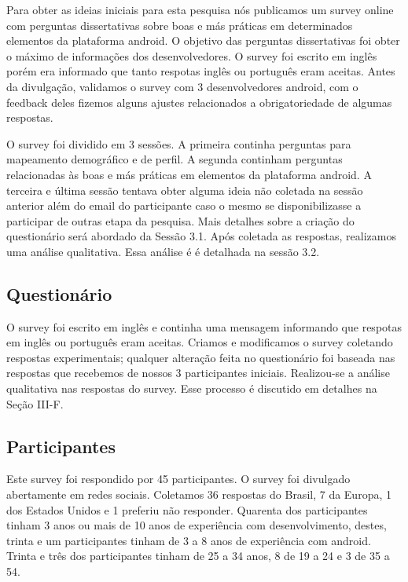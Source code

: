 Para obter as ideias iniciais para esta pesquisa n\'os publicamos um survey online com perguntas dissertativas sobre boas e m\'as pr\'aticas em determinados elementos da plataforma android. O objetivo das perguntas dissertativas foi obter o m\'aximo de informa\c{c}\~oes dos desenvolvedores. O survey foi escrito em ingl\^es porém era informado que tanto respotas ingl\^es ou portugu\^es eram aceitas. Antes da divulga\c{c}\~ao, validamos o survey com 3 desenvolvedores android, com o feedback deles fizemos alguns ajustes relacionados a obrigatoriedade de algumas respostas. 

O survey foi dividido em 3 sess\~oes. A primeira continha perguntas para mapeamento demogr\'afico e de perfil. A segunda continham perguntas relacionadas às boas e m\'as pr\'aticas em elementos da plataforma android. A terceira e última sess\~ao tentava obter alguma ideia n\~ao coletada na sess\~ao anterior além do email do participante caso o mesmo se disponibilizasse a participar de outras etapa da pesquisa. Mais detalhes sobre a cria\c{c}\~ao do question\'ario ser\'a abordado da Sess\~ao 3.1. Ap\'os coletada as respostas, realizamos uma an\'alise qualitativa. Essa an\'alise é é detalhada na sess\~ao 3.2.

\subsection{Question\'ario}

O survey foi escrito em ingl\^es e continha uma mensagem informando que respotas em ingl\^es ou portugu\^es eram aceitas. Criamos e modificamos o survey coletando respostas experimentais; qualquer altera\c{c}\~ao feita no question\'ario foi baseada nas respostas que recebemos de nossos 3 participantes iniciais. Realizou-se a an\'alise qualitativa nas respostas do survey. Esse processo é discutido em detalhes na Se\c{c}\~ao III-F.

\subsection{Participantes}

Este survey foi respondido por 45 participantes. O survey foi divulgado abertamente em redes sociais. Coletamos 36 respostas do Brasil, 7 da Europa, 1 dos Estados Unidos e 1 preferiu n\~ao responder. Quarenta dos participantes tinham 3 anos ou mais de 10 anos de experi\^encia com desenvolvimento, destes, trinta e um participantes tinham de 3 a 8 anos de experi\^encia com android. Trinta e tr\^es dos participantes tinham de 25 a 34 anos, 8 de 19 a 24 e 3 de 35 a 54.

